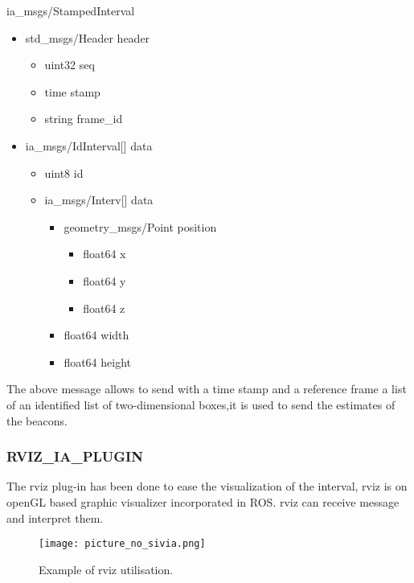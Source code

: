 ia\_msgs/StampedInterval
\begin{itemize}[label={},itemsep=0cm,topsep=0cm]
\item std\_msgs/Header header
  \begin{itemize}[label={},itemsep=0cm,topsep=0cm]
  \item uint32 seq
  \item time stamp
  \item string frame\_id
  \end{itemize}
\item ia\_msgs/IdInterval[] data
  \begin{itemize}[label={},itemsep=0cm,topsep=0cm]
  \item uint8 id
  \item ia\_msgs/Interv[] data
    \begin{itemize}[label={},itemsep=0cm,topsep=0cm]
    \item geometry\_msgs/Point position
      \begin{itemize}[label={},itemsep=0cm,topsep=0cm]
      \item float64 x
      \item float64 y
      \item float64 z
      \end{itemize}
    \item float64 width
    \item float64 height
    \end{itemize}
  \end{itemize}
\end{itemize}

The above message allows to send with a time stamp and a reference frame a list of an identified list of two-dimensional boxes,it is used to send the estimates of the beacons.

\subsubsection*{RVIZ\_IA\_PLUGIN}

The rviz plug-in has been done to ease the visualization of the interval, rviz is on openGL based graphic visualizer incorporated in ROS. rviz can receive message and interpret them.

\begin{figure}[H]
\centering
\texttt{[image: picture\_no\_sivia.png]}
\caption{Example of rviz utilisation.}
\label{fig:rvizEx}
\end{figure}

